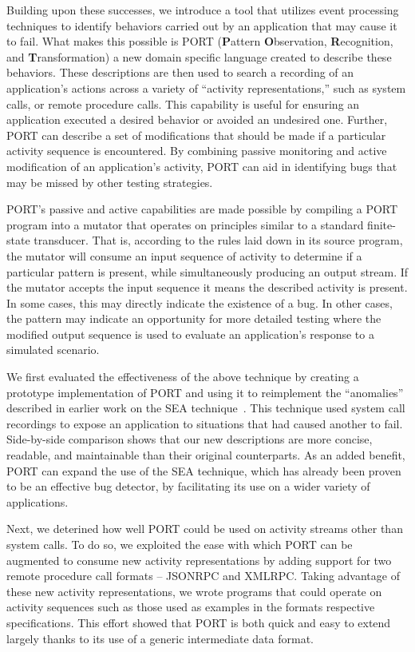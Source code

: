 Building upon these successes,
we introduce a tool
that utilizes event processing techniques
to identify
behaviors carried out by an application
that may cause it to fail.
What makes this possible is PORT
(\textbf{P}attern \textbf{O}bservation, \textbf{R}ecognition, and
\textbf{T}ransformation)
a new domain specific language
created to describe these behaviors.
These descriptions are then used
to search a recording of an application's actions
across a variety of ``activity representations,''
such as system calls,
or remote procedure calls.
This capability is useful
for ensuring an application executed a desired behavior
or avoided an undesired one.
Further, PORT can describe
a set of modifications
that should be made
if a particular activity sequence is encountered.
By combining passive monitoring and active modification
of an application's activity,
PORT can aid in identifying bugs
that may be missed by other testing strategies.

PORT's passive and active capabilities are made possible
by compiling a PORT program
into a mutator
that operates on principles similar
to a standard finite-state transducer.
That is,
according to the rules laid down in its source program,
the mutator will consume an input sequence of activity
to determine if a particular pattern is present,
while simultaneously producing an output stream.
If the mutator accepts the input sequence
it means the described activity is present.
In some cases,
this may directly indicate
the existence of a bug.
In other cases,
the pattern may
indicate an opportunity
for more detailed testing
where the modified output sequence is used
to evaluate an application's response to a simulated scenario.

We first evaluated the effectiveness of the above technique
by creating a prototype implementation of PORT
and using it to
reimplement the ``anomalies''
described in earlier work on the SEA technique~\cite{DBLP:conf/issre/MooreCFW19}.
This technique used system call recordings
to expose an application to situations that had caused another to fail.
Side-by-side comparison shows that our new
descriptions are more concise,
readable,
and maintainable
than their original counterparts.
As an added benefit,
PORT can expand the use of the SEA technique,
which has already been proven
to be an effective bug detector,
by facilitating its use
on a wider variety of applications.

Next, we
deterined how well PORT
could be used on activity streams
other than system calls.
To do so,
we exploited the ease with which
PORT can be augmented
to consume new activity representations
by adding support for two remote procedure call formats -- JSONRPC and XMLRPC.
Taking advantage of these new activity representations,
we wrote programs that could operate on activity sequences such as those
used as examples in the formats respective specifications.
This effort
showed that PORT is both quick and easy to extend largely thanks to its
use of a generic intermediate data format.

